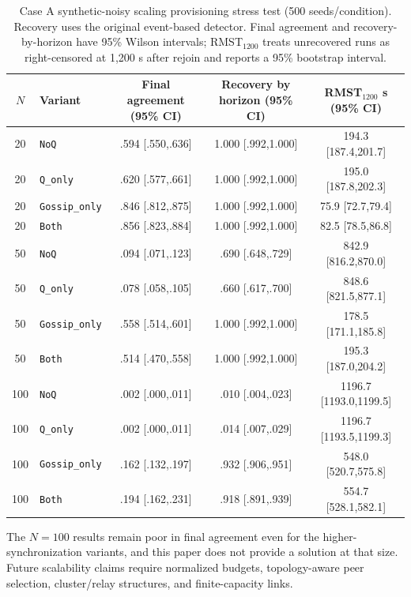 \documentclass[11pt]{article}
\begin{document}
\begin{table}[H]
\centering
\caption{Case A synthetic-noisy scaling provisioning stress test (500 seeds/condition). Recovery uses the original event-based detector. Final agreement and recovery-by-horizon have 95\% Wilson intervals; RMST$_{1200}$ treats unrecovered runs as right-censored at 1,200 s after rejoin and reports a 95\% bootstrap interval.}
\label{tab:scaling}
\scriptsize
\begin{tabular}{clccc}
\toprule
$N$ & Variant & Final agreement (95\% CI) & Recovery by horizon (95\% CI) & RMST$_{1200}$ s (95\% CI)\\
\midrule
20 & \texttt{NoQ} & .594 [.550,.636] & 1.000 [.992,1.000] & 194.3 [187.4,201.7]\\
20 & \texttt{Q\_only} & .620 [.577,.661] & 1.000 [.992,1.000] & 195.0 [187.8,202.3]\\
20 & \texttt{Gossip\_only} & .846 [.812,.875] & 1.000 [.992,1.000] & 75.9 [72.7,79.4]\\
20 & \texttt{Both} & .856 [.823,.884] & 1.000 [.992,1.000] & 82.5 [78.5,86.8]\\
\midrule
50 & \texttt{NoQ} & .094 [.071,.123] & .690 [.648,.729] & 842.9 [816.2,870.0]\\
50 & \texttt{Q\_only} & .078 [.058,.105] & .660 [.617,.700] & 848.6 [821.5,877.1]\\
50 & \texttt{Gossip\_only} & .558 [.514,.601] & 1.000 [.992,1.000] & 178.5 [171.1,185.8]\\
50 & \texttt{Both} & .514 [.470,.558] & 1.000 [.992,1.000] & 195.3 [187.0,204.2]\\
\midrule
100 & \texttt{NoQ} & .002 [.000,.011] & .010 [.004,.023] & 1196.7 [1193.0,1199.5]\\
100 & \texttt{Q\_only} & .002 [.000,.011] & .014 [.007,.029] & 1196.7 [1193.5,1199.3]\\
100 & \texttt{Gossip\_only} & .162 [.132,.197] & .932 [.906,.951] & 548.0 [520.7,575.8]\\
100 & \texttt{Both} & .194 [.162,.231] & .918 [.891,.939] & 554.7 [528.1,582.1]\\
\bottomrule
\end{tabular}
\end{table}

The $N=100$ results remain poor in final agreement even for the higher-synchronization variants, and this paper does not provide a solution at that size. Future scalability claims require normalized budgets, topology-aware peer selection, cluster/relay structures, and finite-capacity links.
\end{document}
